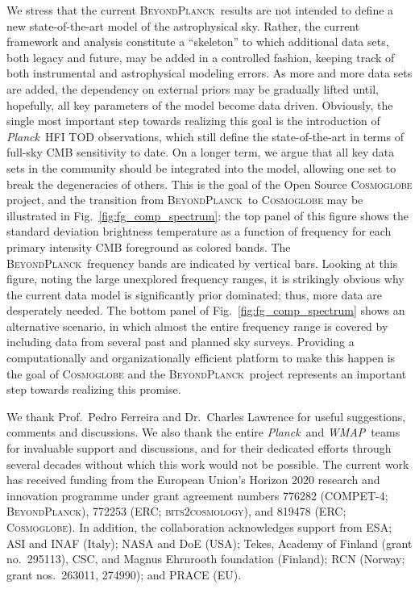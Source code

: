 \documentclass{aa}
\def\Planck{\textit{Planck}}
\def\WMAP{\emph{WMAP}}
\newcommand{\BP}{\textsc{BeyondPlanck}}
\begin{document}
We stress that the current \BP\ results are not intended to define a
new state-of-the-art model of the astrophysical sky. Rather, the
current framework and analysis constitute a ``skeleton'' to which
additional data sets, both legacy and future, may be added in a
controlled fashion, keeping track of both instrumental and
astrophysical modeling errors. As more and more data sets are added,
the dependency on external priors may be gradually lifted until,
hopefully, all key parameters of the model become data
driven. Obviously, the single most important step towards realizing
this goal is the introduction of \Planck\ HFI TOD observations, which
still define the state-of-the-art in terms of full-sky CMB sensitivity
to date. On a longer term, we argue that all key data sets in the
community should be integrated into the model, allowing one set to
break the degeneracies of others. This is the goal of the Open Source
\textsc{Cosmoglobe} project, and the transition from \BP\ to
\textsc{Cosmoglobe} may be illustrated in
Fig.~\ref{fig:fg_comp_spectrum}: the top panel of this figure shows
the standard deviation brightness temperature as a function of
frequency for each primary intensity CMB foreground as colored
bands. The \BP\ frequency bands are indicated by vertical
bars. Looking at this figure, noting the large unexplored frequency
ranges, it is strikingly obvious why the current data model is
significantly prior dominated; thus, more data are desperately needed. The
bottom panel of Fig.~\ref{fig:fg_comp_spectrum} shows an alternative
scenario, in which almost the entire frequency range is
covered by including data from several past and planned sky surveys.
Providing a computationally and organizationally efficient
platform to make this happen is the goal of \textsc{Cosmoglobe} and
the \BP\ project represents an important step towards realizing this
promise. 

%
\begin{acknowledgements}
  We thank Prof.\ Pedro Ferreira and Dr.\ Charles Lawrence for useful suggestions, comments and 
  discussions. We also thank the entire \Planck\ and \WMAP\ teams for
  invaluable support and discussions, and for their dedicated efforts
  through several decades without which this work would not be
  possible. The current work has received funding from the European
  Union’s Horizon 2020 research and innovation programme under grant
  agreement numbers 776282 (COMPET-4; \BP), 772253 (ERC;
  \textsc{bits2cosmology}), and 819478 (ERC; \textsc{Cosmoglobe}). In
  addition, the collaboration acknowledges support from ESA; ASI and
  INAF (Italy); NASA and DoE (USA); Tekes, Academy of Finland (grant
   no.\ 295113), CSC, and Magnus Ehrnrooth foundation (Finland); RCN
  (Norway; grant nos.\ 263011, 274990); and PRACE (EU).
\end{acknowledgements}




\end{document}
